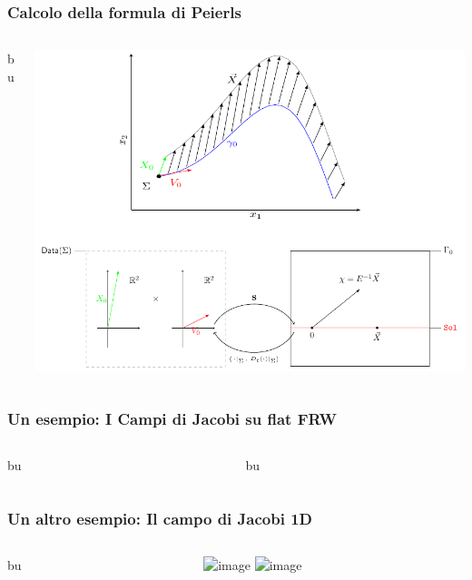 \documentclass{beamer}
\begin{document}
	
	\begin{frame}
		\frametitle{Calcolo della formula di Peierls}
		  	\begin{columns}[T]
    			\begin{column}{.5\textwidth}
					bu
    			\end{column}
    		   	\begin{column}{.5\textwidth}
					\includegraphics[width=\textwidth]{Pictures/Jacobi_GeometricPicturePanoramica}	
    			\end{column}
    		\end{columns}
	\end{frame}
	
	
	\begin{frame}
		\frametitle{Un esempio: I Campi di Jacobi su flat FRW}
		  	\begin{columns}[T]
    			\begin{column}{.5\textwidth}
					bu
    			\end{column}
    		   	\begin{column}{.5\textwidth}
					bu
    			\end{column}
    		\end{columns}
	\end{frame}	
	
	\begin{frame}
		\frametitle{Un altro esempio: Il campo di Jacobi 1D}
		  	\begin{columns}[T]
    			\begin{column}{.5\textwidth}
					bu
    			\end{column}
    		   	\begin{column}{.5\textwidth}
					\includegraphics<1>[width=\textwidth]{Pictures/Jacobi1D_GeometricPicture0}
					\includegraphics<2>[width=\textwidth]{Pictures/Jacobi1D_GeometricPicturePanoramica}	
    			\end{column}
    		\end{columns}
	\end{frame}	
	
\end{document}

